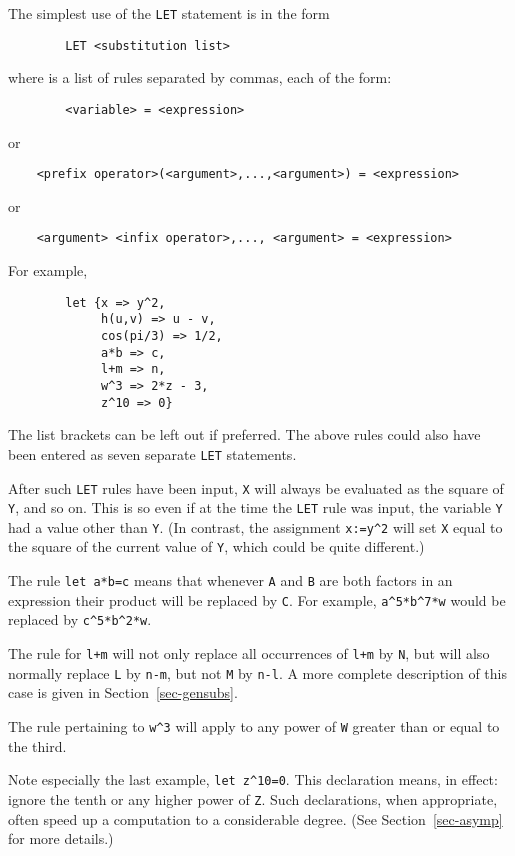 \documentclass[11pt,letterpaper]{book}
\begin{document}
The simplest use of the {\tt LET} statement is in the form
{\small\begin{verbatim}
        LET <substitution list>
\end{verbatim}}
where {\tt <substitution list>} is a list of rules separated by commas, each
of the form:
{\small\begin{verbatim}
        <variable> = <expression>
\end{verbatim}}
or
{\small\begin{verbatim}
    <prefix operator>(<argument>,...,<argument>) = <expression>
\end{verbatim}}
or
{\small\begin{verbatim}
    <argument> <infix operator>,..., <argument> = <expression>
\end{verbatim}}
For example,
{\small\begin{verbatim}
        let {x => y^2,
             h(u,v) => u - v,
             cos(pi/3) => 1/2,
             a*b => c,
             l+m => n,
             w^3 => 2*z - 3,
             z^10 => 0}
\end{verbatim}}
The list brackets can be left out if preferred.  The above rules could
also have been entered as seven separate {\tt LET} statements.

After such {\tt LET} rules have been input, {\tt X} will always be
evaluated as the square of {\tt Y}, and so on.  This is so even if at the
time the {\tt LET} rule was input, the variable {\tt Y} had a value other
than {\tt Y}. (In contrast, the assignment {\tt x:=y\verb|^|2} will set {\tt X}
equal to the square of the current value of {\tt Y}, which could be quite
different.)

The rule {\tt let a*b=c} means that whenever {\tt A} and {\tt B} are both
factors in an expression their product will be replaced by {\tt C}.  For
example, {\tt a\verb|^|5*b\verb|^|7*w} would be replaced by
{\tt c\verb|^|5*b\verb|^|2*w}.

The rule for {\tt l+m} will not only replace all occurrences of {\tt l+m}
by {\tt N}, but will also normally replace {\tt L} by {\tt n-m}, but not
{\tt M} by {\tt n-l}.  A more complete description of this case is given
in Section~\ref{sec-gensubs}.

The rule pertaining to {\tt w\verb|^|3} will apply to any power of {\tt W}
greater than or equal to the third.

Note especially the last example, {\tt let z\verb|^|10=0}.  This declaration
means, in effect: ignore the tenth or any higher power of {\tt Z}.  Such
declarations, when appropriate, often speed up a computation to a
considerable degree. (See
Section~\ref{sec-asymp} for more details.)
\end{document}
